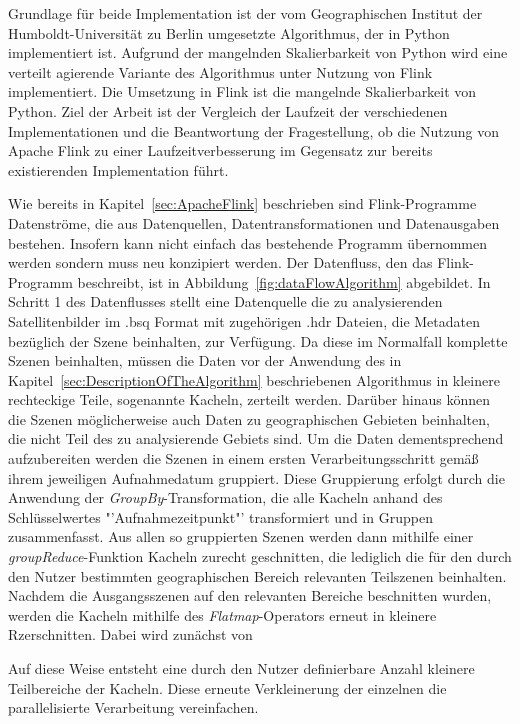 Grundlage für beide Implementation ist der vom Geographischen Institut der Humboldt-Universität zu Berlin umgesetzte Algorithmus, der in Python implementiert ist. Aufgrund der mangelnden Skalierbarkeit von Python wird eine verteilt agierende Variante des Algorithmus unter Nutzung von Flink implementiert. Die Umsetzung in Flink ist die mangelnde Skalierbarkeit von Python. Ziel der Arbeit ist der Vergleich der Laufzeit der verschiedenen Implementationen und die Beantwortung der Fragestellung, ob die Nutzung von Apache Flink zu einer Laufzeitverbesserung im Gegensatz zur bereits existierenden Implementation führt.

Wie bereits in Kapitel~\ref{sec:ApacheFlink} beschrieben sind Flink-Programme Datenströme, die aus Datenquellen, Datentransformationen und Datenausgaben bestehen. Insofern kann nicht einfach das bestehende Programm übernommen werden sondern muss neu konzipiert werden. Der Datenfluss, den das Flink-Programm beschreibt, ist in Abbildung~\ref{fig:dataFlowAlgorithm} abgebildet. In Schritt 1 des Datenflusses stellt eine Datenquelle die zu analysierenden Satellitenbilder im .bsq Format mit zugehörigen .hdr Dateien, die Metadaten bezüglich der Szene beinhalten, zur Verfügung. Da diese im Normalfall komplette Szenen beinhalten, müssen die Daten vor der Anwendung des in Kapitel~\ref{sec:DescriptionOfTheAlgorithm} beschriebenen Algorithmus in kleinere rechteckige Teile, sogenannte Kacheln, zerteilt werden. Darüber hinaus können die Szenen möglicherweise auch Daten zu geographischen Gebieten beinhalten, die nicht Teil des zu analysierende Gebiets sind. Um die Daten dementsprechend aufzubereiten werden die Szenen in einem ersten Verarbeitungsschritt gemäß ihrem jeweiligen Aufnahmedatum gruppiert. Diese Gruppierung erfolgt durch die Anwendung der \textit{GroupBy}-Transformation, die alle Kacheln anhand des Schlüsselwertes "'Aufnahmezeitpunkt"' transformiert und in Gruppen zusammenfasst. Aus allen so gruppierten Szenen werden dann mithilfe einer \textit{groupReduce}-Funktion Kacheln zurecht geschnitten, die lediglich die für den durch den Nutzer bestimmten geographischen Bereich relevanten Teilszenen beinhalten. Nachdem die Ausgangsszenen auf den relevanten Bereiche beschnitten wurden, werden die Kacheln mithilfe des \textit{Flatmap}-Operators erneut in kleinere Rzerschnitten. Dabei wird zunächst von 

Auf diese Weise entsteht eine durch den Nutzer definierbare Anzahl kleinere Teilbereiche der Kacheln. Diese erneute Verkleinerung der einzelnen  die parallelisierte Verarbeitung vereinfachen. 
 

